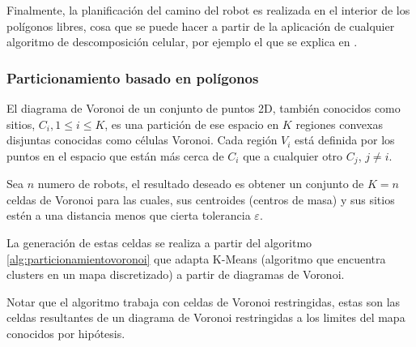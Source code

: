 
Finalmente, la planificación del camino del robot es realizada en el interior de los polígonos libres, cosa que se puede hacer a partir de la aplicación de cualquier algoritmo de descomposición celular, por ejemplo el que se explica en \cite{schachter1978decomposition}.
   
\subsubsection{Particionamiento basado en polígonos}\label{subsubsec:particionamientovoronoi}
El diagrama de Voronoi\cite{fortune1987sweepline} de un conjunto de puntos 2D, también conocidos como sitios, $C_{i} , 1 \leq i \leq K$, es una partición de ese espacio en $K$ regiones convexas disjuntas conocidas como células Voronoi. Cada región $V_i$ está definida por los puntos en el espacio que están más cerca de $C_{i}$ que a cualquier otro $C_{j}$, $j\neq i$. 

Sea $n$ numero de robots, el resultado deseado es obtener un conjunto de $K=n$ celdas de Voronoi para las cuales, sus centroides (centros de masa) y sus sitios estén a una distancia menos que cierta tolerancia $\varepsilon$. %

La generación de estas celdas se realiza a partir del algoritmo \ref{alg:particionamientovoronoi} que adapta K-Means (algoritmo que encuentra clusters en un mapa discretizado) a partir de diagramas de Voronoi.

Notar que el algoritmo trabaja con celdas de Voronoi restringidas, estas son las celdas resultantes de un diagrama de Voronoi restringidas a los limites del mapa conocidos por hipótesis.

